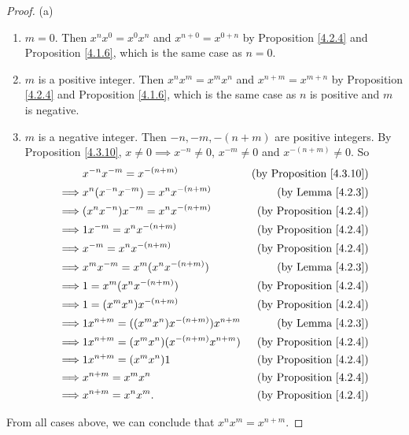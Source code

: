 \begin{proof}{(a)}
\begin{enumerate}[label=(\Roman*)]
    \begin{enumerate}[label=(\roman*)]
        \item \(m = 0\).
        Then \(x^n x^0 = x^0 x^n\) and \(x^{n + 0} = x^{0 + n}\) by Proposition \ref{4.2.4} and Proposition \ref{4.1.6}, which is the same case as \(n = 0\).
        \item \(m\) is a positive integer.
        Then \(x^n x^m = x^m x^n\) and \(x^{n + m} = x^{m + n}\) by Proposition \ref{4.2.4} and Proposition \ref{4.1.6}, which is the same case as \(n\) is positive and \(m\) is negative.
        \item \(m\) is a negative integer.
        Then \(-n, -m, -(n + m)\) are positive integers.
        By Proposition \ref{4.3.10}, \(x \neq 0 \implies x^{-n} \neq 0\), \(x^{-m} \neq 0\) and \(x^{-(n + m)} \neq 0\).
        So
        \begin{align*}
        & x^{-n} x^{-m} = x^{-(n + m)} & \text{(by Proposition \ref{4.3.10})} \\
        \implies & x^n (x^{-n} x^{-m}) = x^n x^{-(n + m)} & \text{(by Lemma \ref{4.2.3})} \\
        \implies & (x^n x^{-n}) x^{-m} = x^n x^{-(n + m)} & \text{(by Proposition \ref{4.2.4})} \\
        \implies & 1x^{-m} = x^n x^{-(n + m)} & \text{(by Proposition \ref{4.2.4})} \\
        \implies & x^{-m} = x^n x^{-(n + m)} & \text{(by Proposition \ref{4.2.4})} \\
        \implies & x^m x^{-m} = x^m (x^n x^{-(n + m)}) & \text{(by Lemma \ref{4.2.3})} \\
        \implies & 1 = x^m (x^n x^{-(n + m)}) & \text{(by Proposition \ref{4.2.4})} \\
        \implies & 1 = (x^m x^n) x^{-(n + m)} & \text{(by Proposition \ref{4.2.4})} \\
        \implies & 1x^{n + m} = ((x^m x^n) x^{-(n + m)})x^{n + m} & \text{(by Lemma \ref{4.2.3})} \\
        \implies & 1x^{n + m} = (x^m x^n)(x^{-(n + m)} x^{n + m}) & \text{(by Proposition \ref{4.2.4})} \\
        \implies & 1x^{n + m} = (x^m x^n)1 & \text{(by Proposition \ref{4.2.4})} \\
        \implies & x^{n + m} = x^m x^n & \text{(by Proposition \ref{4.2.4})} \\
        \implies & x^{n + m} = x^n x^m. & \text{(by Proposition \ref{4.2.4})}
        \end{align*}
    \end{enumerate}
\end{enumerate}
From all cases above, we can conclude that \(x^n x^m = x^{n + m}\).


\end{proof}
